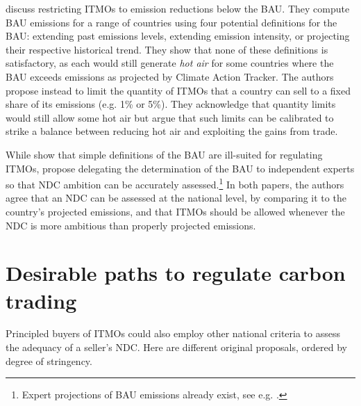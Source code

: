 \documentclass[12pt,english]{article}
\begin{document}
\cite{la_hoz_theuer_when_2019} discuss restricting ITMOs to emission reductions below the BAU. They compute BAU emissions for a range of countries using four potential definitions for the BAU: extending past emissions levels, extending emission intensity, or projecting their respective historical trend. They show that none of these definitions is satisfactory, as each would still generate \textit{hot air} for some countries where the BAU exceeds emissions as projected by Climate Action Tracker. The authors propose instead to limit the quantity of ITMOs that a country can sell to a fixed share of its emissions (e.g. 1\% or 5\%). They acknowledge that quantity limits would still allow some hot air but argue that such limits can be calibrated to strike a balance between reducing hot air and exploiting the gains from %
trade. %


While \cite{la_hoz_theuer_when_2019} show that simple definitions of the BAU are ill-suited for regulating ITMOs, \cite{michaelowa_additionality_2019} propose delegating the determination of the BAU to independent experts so that NDC ambition can be accurately assessed.\footnote{Expert projections of BAU emissions already exist, see e.g. \cite{den_elzen_are_2019,den_elzen_impact_2023,den_elzen_infographics_2024,unep_emissions_2025}.} In both papers, the authors agree that an NDC can be assessed at the national level, by comparing it to the country's projected emissions, and that ITMOs should be allowed whenever the NDC is more ambitious than properly projected emissions. 

\section{Desirable paths to regulate carbon trading\label{subsec:desirable}}

Principled %
buyers of ITMOs could also employ other national criteria to assess the adequacy of a seller's NDC. Here are different original proposals, ordered by degree of stringency.
\end{document}
